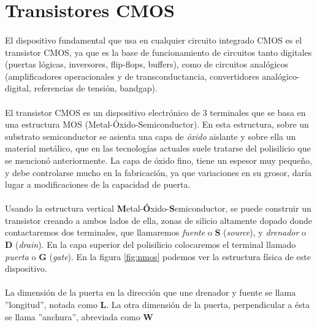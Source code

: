\section{Transistores CMOS}\label{cap:transistor_cmos}
\paragraph{}
El dispositivo fundamental que usa en cualquier circuito integrado CMOS es el
transistor CMOS, ya que es la base de funcionamiento de circuitos tanto digitales
(puertas lógicas, inversores, flip-flops, buffers), como de circuitos analógicos
(amplificadores operacionales y de transconductancia, convertidores analógico-digital,
referencias de tensión, bandgap).

\paragraph{}
El transistor CMOS es un dispositivo electrónico de 3 terminales que se basa
en una estructura MOS (Metal-Óxido-Semiconductor)\cite{Razavi2016}\cite{Allen2002}.
En esta estructura, sobre un
substrato semiconductor se asienta una capa de \textit{óxido} aislante y sobre ella un
material metálico, que en las tecnologías actuales suele tratarse del polisilicio
que se mencionó anteriormente. La capa de óxido fino, tiene un espesor muy pequeño,
y debe controlarse mucho en la fabricación, ya que variaciones en su grosor, daría
lugar a modificaciones de la capacidad de puerta.

\paragraph{}
Usando la estructura vertical \textbf{M}etal-\textbf{Ó}xido-\textbf{S}emiconductor,
se puede construir un transistor creando a ambos lados de ella, zonas de silicio
altamente dopado donde contactaremos dos terminales, que llamaremos \textit{fuente} o \textbf{S}
(\textit{source}), y \textit{drenador} o \textbf{D} (\textit{drain}). En la capa superior
del polisilicio colocaremos el terminal llamado \textit{puerta} o \textbf{G} (\textit{gate}).
En la figura \ref{fig:nmos} podemos ver la estructura física de este dispositivo.

\paragraph{}
La dimensión de la puerta en la dirección que une drenador y fuente se llama
''longitud'', notada como \textbf{L}. La otra dimensión de la puerta, perpendicular a ésta
se llama ''anchura'', abreviada como \textbf{W}

